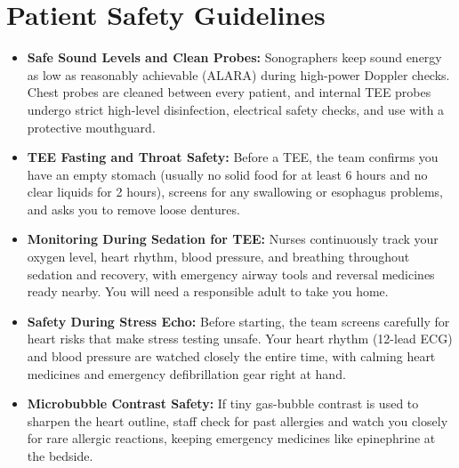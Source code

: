 \section{Patient Safety Guidelines}
\begin{itemize}
\item \textbf{Safe Sound Levels and Clean Probes:} Sonographers keep sound energy as low as reasonably achievable (ALARA) during high-power Doppler checks. Chest probes are cleaned between every patient, and internal TEE probes undergo strict high-level disinfection, electrical safety checks, and use with a protective mouthguard.
\item \textbf{TEE Fasting and Throat Safety:} Before a TEE, the team confirms you have an empty stomach (usually no solid food for at least 6 hours and no clear liquids for 2 hours), screens for any swallowing or esophagus problems, and asks you to remove loose dentures.
\item \textbf{Monitoring During Sedation for TEE:} Nurses continuously track your oxygen level, heart rhythm, blood pressure, and breathing throughout sedation and recovery, with emergency airway tools and reversal medicines ready nearby. You will need a responsible adult to take you home.
\item \textbf{Safety During Stress Echo:} Before starting, the team screens carefully for heart risks that make stress testing unsafe. Your heart rhythm (12-lead ECG) and blood pressure are watched closely the entire time, with calming heart medicines and emergency defibrillation gear right at hand.
\item \textbf{Microbubble Contrast Safety:} If tiny gas-bubble contrast is used to sharpen the heart outline, staff check for past allergies and watch you closely for rare allergic reactions, keeping emergency medicines like epinephrine at the bedside.
\end{itemize}


